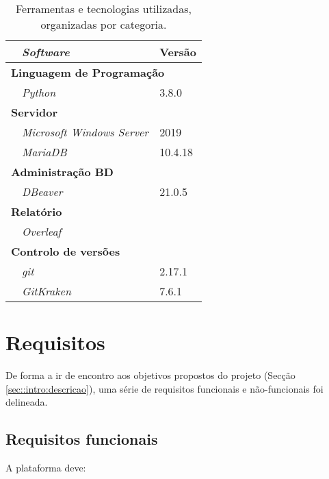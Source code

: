 \begin{table}[!htbp]
    \centering
    \begin{tabular}{p{1cm} l l}
        \toprule
        & {\itshape\bfseries Software} & {\bfseries Versão} \\
        \midrule
        \multicolumn{3}{l}{\bfseries Linguagem de Programação} \\
        & \textit{Python} & 3.8.0 \\
        \midrule
        \multicolumn{3}{l}{\bfseries Servidor} \\
        & \textit{Microsoft Windows Server} & 2019 \\
        & \textit{MariaDB} & 10.4.18 \\
        \midrule
        \multicolumn{3}{l}{\bfseries Administração BD} \\
        & \textit{DBeaver} & 21.0.5 \\
        \midrule
        \multicolumn{3}{l}{\bfseries Relatório} \\
        & \textit{Overleaf} & \\
        \midrule
        \multicolumn{3}{l}{\bfseries Controlo de versões} \\
        & \textit{git} & 2.17.1 \\
        & \textit{GitKraken} & 7.6.1  \\
        \midrule
        \bottomrule
    \end{tabular}
    \caption[Ferramentas utilizadas]{Ferramentas e tecnologias utilizadas, organizadas por categoria.}
    \label{tab::ferramentas}
\end{table}



\section{Requisitos}
\label{sec::engsoft:requisitos}

De forma a ir de encontro aos objetivos propostos do projeto (Secção \ref{sec::intro:descricao}), uma série de requisitos funcionais e não-funcionais foi delineada.

\subsection{Requisitos funcionais}
\label{ssec::engsoft:requisitos:funcionais}

A plataforma deve:

